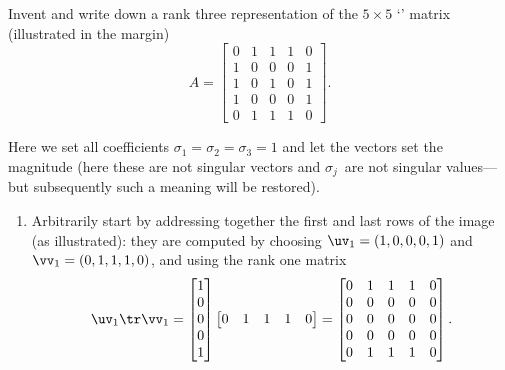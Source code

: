\begin{example} \label{eg:}
Invent and write down a rank three representation of the \(5\times5\) `' matrix (illustrated in the margin)
\marginpar{}
\begin{equation*}
A=\begin{bmatrix} 0&1&1&1&0
\\1&0&0&0&1
\\1&0&1&0&1
\\1&0&0&0&1
\\0&1&1&1&0 \end{bmatrix}.
\end{equation*}
\begin{solution} 
Here we set all coefficients \(\sigma_1=\sigma_2=\sigma_3=1\) and let the vectors set the magnitude (here these are not singular vectors and \(\sigma_j\)~are not singular values---but subsequently such a meaning will be restored).
\begin{enumerate}
\item Arbitrarily start by addressing together the first and last rows of the image (as illustrated): they are computed by choosing  \(\uv_1=(1,0,0,0,1)\) and \(\vv_1=(0,1,1,1,0)\), and using the rank one matrix
\marginpar{}
\begin{equation*}
\uv_1\tr\vv_1
=\begin{bmatrix} 1\\0\\0\\0\\1 \end{bmatrix}
\begin{bmatrix} 0&1&1&1&0 \end{bmatrix}
=\begin{bmatrix} 0&1&1&1&0
\\0&0&0&0&0
\\0&0&0&0&0
\\0&0&0&0&0
\\0&1&1&1&0 \end{bmatrix}.
\end{equation*}


\end{enumerate}
\end{solution}
\end{example}
